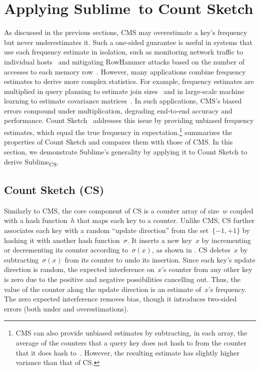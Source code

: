 \documentclass[sigconf]{acmart}
\newcommand{\sketch}{Sublime}
\newcommand{\sketchcs}{\sketch\textsubscript{CS}\xspace}
\begin{document}
\section{Applying \sketch\ to Count Sketch}\label{sec:cs}
As discussed in the previous sections, CMS may overestimate a key's frequency but never underestimates it.
Such a one-sided guarantee is useful in systems that use each frequency estimate in isolation, such as monitoring network traffic to individual hosts~\cite{SketchBasedChangeDetection,WhatsNew,SketchingStreamsNet,TrafficManagementSurvey,RandomizedAdmissionEstimation,Blink,LOFT} and mitigating RowHammer attacks based on the number of accesses to each memory row~\cite{CoMeT}.
However, many applications combine frequency estimates to derive more complex statistics.
For example, frequency estimates are multiplied in query planning to estimate join sizes~\cite{Compass,QueryOptimizationSketches,ConvolutionSketch} and in large-scale machine learning to estimate covariance matrices~\cite{ASCS}.
In such applications, CMS's biased errors compound under multiplication, degrading end-to-end accuracy and performance.
Count Sketch~\cite{CountSketch} addresses this issue by providing unbiased frequency estimates, which equal the true frequency in expectation.\footnote{CMS can also provide unbiased estimates by subtracting, in each array, the average of the counters that a query key does not hash to from the counter that it does hash to~\cite{CountMeanMin}. However, the resulting estimate has slightly higher variance than that of CS.}
 summarizes the properties of Count Sketch and compares them with those of CMS.
In this section, we demonstrate \sketch's generality by applying it to Count Sketch to derive \sketchcs.

\subsection{Count Sketch (CS)}\label{sec:cs_background}
Similarly to CMS, the core component of CS is a counter array of size~$w$ coupled with a hash function~$h$ that maps each key to a counter.
Unlike CMS, CS further associates each key with a random ``update direction'' from the set~$\{-1,+1\}$ by hashing it with another hash function~$\sigma$.
It inserts a new key~$x$ by incrementing or decrementing its counter according to~$\sigma(x)$, as shown in .
CS deletes~$x$ by subtracting~$\sigma(x)$ from its counter to undo its insertion.
Since each key's update direction is random, the expected interference on~$x$'s counter from any other key is zero due to the positive and negative possibilities cancelling out.
Thus, the value of the counter along the update direction is an estimate of~$x$'s frequency.
The zero expected interference removes bias, though it introduces two-sided errors (both under and overestimations). 
\end{document}
